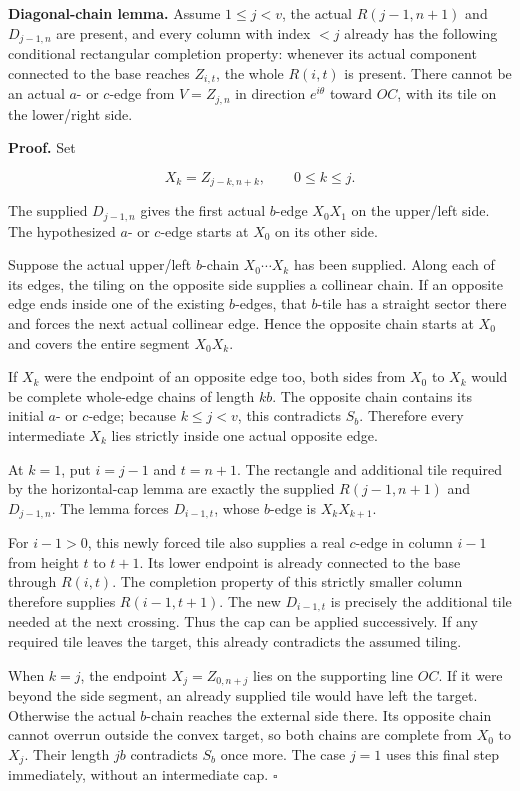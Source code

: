\documentclass[
  11pt,
  a4paper,
]{article}
\begin{document}
\textbf{Diagonal-chain lemma.} Assume \(1\le j<v\), the actual
\(R(j-1,n+1)\) and \(D_{j-1,n}\) are present, and every column with
index \(<j\) already has the following conditional rectangular
completion property: whenever its actual component connected to the base
reaches \(Z_{i,t}\), the whole \(R(i,t)\) is present. There cannot be an
actual \(a\)- or \(c\)-edge from \(V=Z_{j,n}\) in direction
\(e^{i\theta}\) toward \(OC\), with its tile on the lower/right side.

\textbf{Proof.} Set

\[
X_k=Z_{j-k,n+k},\qquad0\le k\le j.
\]

The supplied \(D_{j-1,n}\) gives the first actual \(b\)-edge \(X_0X_1\)
on the upper/left side. The hypothesized \(a\)- or \(c\)-edge starts at
\(X_0\) on its other side.

Suppose the actual upper/left \(b\)-chain \(X_0\cdots X_k\) has been
supplied. Along each of its edges, the tiling on the opposite side
supplies a collinear chain. If an opposite edge ends inside one of the
existing \(b\)-edges, that \(b\)-tile has a straight sector there and
forces the next actual collinear edge. Hence the opposite chain starts
at \(X_0\) and covers the entire segment \(X_0X_k\).

If \(X_k\) were the endpoint of an opposite edge too, both sides from
\(X_0\) to \(X_k\) would be complete whole-edge chains of length \(kb\).
The opposite chain contains its initial \(a\)- or \(c\)-edge; because
\(k\le j<v\), this contradicts \(S_b\). Therefore every intermediate
\(X_k\) lies strictly inside one actual opposite edge.

At \(k=1\), put \(i=j-1\) and \(t=n+1\). The rectangle and additional
tile required by the horizontal-cap lemma are exactly the supplied
\(R(j-1,n+1)\) and \(D_{j-1,n}\). The lemma forces \(D_{i-1,t}\), whose
\(b\)-edge is \(X_kX_{k+1}\).

For \(i-1>0\), this newly forced tile also supplies a real \(c\)-edge in
column \(i-1\) from height \(t\) to \(t+1\). Its lower endpoint is
already connected to the base through \(R(i,t)\). The completion
property of this strictly smaller column therefore supplies
\(R(i-1,t+1)\). The new \(D_{i-1,t}\) is precisely the additional tile
needed at the next crossing. Thus the cap can be applied successively.
If any required tile leaves the target, this already contradicts the
assumed tiling.

When \(k=j\), the endpoint \(X_j=Z_{0,n+j}\) lies on the supporting line
\(OC\). If it were beyond the side segment, an already supplied tile
would have left the target. Otherwise the actual \(b\)-chain reaches the
external side there. Its opposite chain cannot overrun outside the
convex target, so both chains are complete from \(X_0\) to \(X_j\).
Their length \(jb\) contradicts \(S_b\) once more. The case \(j=1\) uses
this final step immediately, without an intermediate cap. \(\square\)
\end{document}
